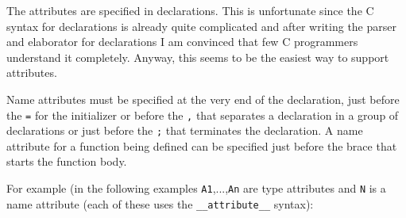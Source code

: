 \documentclass[letterpaper]{article}
\def\t#1{{\tt #1}}
\begin{document}
 The attributes are specified in declarations. This is unfortunate since the C
syntax for declarations is already quite complicated and after writing the
parser and elaborator for declarations I am convinced that few C programmers
understand it completely. Anyway, this seems to be the easiest way to support
attributes. 

 Name attributes must be specified at the very end of the declaration, just
before the \t{=} for the initializer or before the \t{,} that separates a
declaration in a group of declarations or just before the \t{;} that
terminates the declaration. A name attribute for a function being defined can
be specified just before the brace that starts the function body.

 For example (in the following examples \t{A1},...,\t{An} are type attributes
and \t{N} is a name attribute (each of these uses the \t{\_\_attribute\_\_} syntax):

\end{document}
